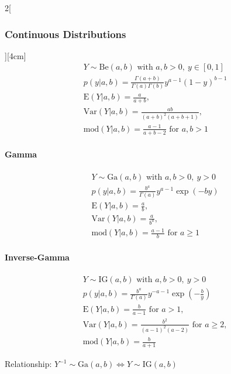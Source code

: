 \documentclass[8pt]{extarticle}
\begin{document}
\begin{multicols}{2}[\subsubsection{Continuous Distributions}][4cm]
    \begin{align*}
    & Y \sim \mathrm{Be}(a, b) \text{ with } a,b > 0,\: y \in \left[0,1\right]\\
    & p(y|a, b) =\frac{\Gamma \left( a+b\right) }{\Gamma (a) \Gamma (b)} y^{a-1} (1-y)^{b-1} \\
    & \mathrm{E}(Y|a, b) = \frac{a}{a+b},\\
    & \mathrm{Var}(Y|a, b) = \frac{ab}{\left(a+b\right)^2(a+b+1)}, \\
    & \mathrm{mod}(Y|a, b) = \frac{a-1}{a+b-2} \text{ for } a,b > 1
  \end{align*}
  
  
  	\paragraph{Gamma}
  
    \begin{align*}
    & Y \sim \mathrm{Ga}(a, b) \text{ with } a,b > 0,\: y > 0\\
    & p(y|a, b) = \frac{ b^a }{\Gamma (a)} y^{a-1} \exp (-by) \\
    & \mathrm{E}(Y|a, b) = \frac{a}{b},\\
    & \mathrm{Var}(Y|a, b) = \frac{a}{b^a}, \\
    & \mathrm{mod}(Y|a, b) = \frac{a-1}{b} \text{ for } a \ge 1
  \end{align*}

  	\paragraph{Inverse-Gamma}
  
    \begin{align*}
    & Y \sim \mathrm{IG}(a, b) \text{ with } a,b > 0,\: y > 0\\
    & p(y|a, b) = \frac{ b^a }{\Gamma (a)} y^{-a-1} \exp (-\frac{b}{y}) \\
    & \mathrm{E}(Y|a, b) = \frac{b}{a-1} \text{ for } a > 1,\\
    & \mathrm{Var}(Y|a, b) = \frac{b^2}{(a-1)^2(a-2)} \text{ for } a \ge 2, \\
    & \mathrm{mod}(Y|a, b) = \frac{b}{a+1}
  \end{align*}
  
\noindent Relationship: $Y^{-1} \sim \mathrm{Ga}(a, b) \Leftrightarrow Y \sim \mathrm{IG}(a, b)$
  
  

  
  

\end{multicols}
\end{document}

